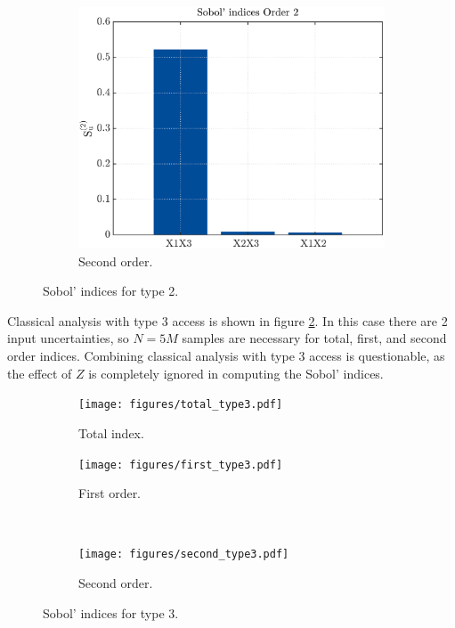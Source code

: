 \documentclass{elsarticle}
\begin{document}
\begin{figure}[hbtp]
\begin{subfigure}[b]{.49\textwidth}
	\centering
	\includegraphics[width=\textwidth]{figures/second_type2.pdf}
	\caption{Second order.\label{fig:second_type2}}
	\end{subfigure}
	\caption{Sobol' indices for type 2.\label{fig:type2}}
\end{figure}

Classical analysis with type 3 access is shown in figure \ref{fig:type2}. In this case there are 2 input uncertainties, so $N=5M$ samples are necessary for total, first, and second order indices. Combining classical analysis with type 3 access is questionable, as the effect of $Z$ is completely ignored in computing the Sobol' indices.

\begin{figure}[hbtp]
\centering
	\begin{subfigure}[b]{.49\textwidth}
	\centering
	\texttt{[image: figures/total\_type3.pdf]}
	\caption{Total index.\label{fig:total_type3}}
	\end{subfigure}
	\hfill
	\begin{subfigure}[b]{.49\textwidth}
	\centering
	\texttt{[image: figures/first\_type3.pdf]}
	\caption{First order.\label{fig:first_type3}}
	\end{subfigure}\\
	\begin{subfigure}[b]{.49\textwidth}
	\centering
	\texttt{[image: figures/second\_type3.pdf]}
	\caption{Second order.\label{fig:second_type3}}
	\end{subfigure}
	\caption{Sobol' indices for type 3.\label{fig:type3}}
\end{figure}
\end{document}
